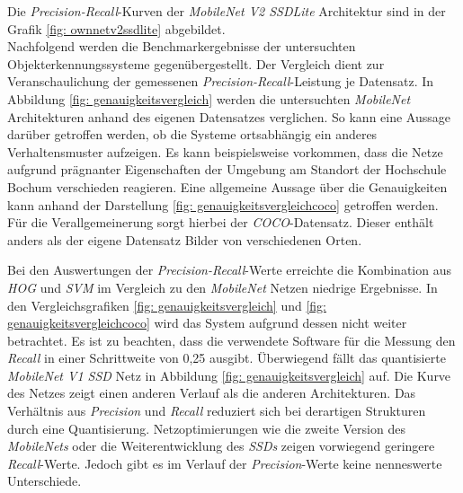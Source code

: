  

 
  
Die \textit{Precision-Recall}-Kurven der \textit{MobileNet V2 SSDLite} Architektur sind in der Grafik \ref{fig: ownnetv2ssdlite} abgebildet. \\

Nachfolgend werden die Benchmarkergebnisse der untersuchten Objekterkennungssysteme gegenübergestellt. Der Vergleich dient zur Veranschaulichung der gemessenen \textit{Precision-Recall}-Leistung je Datensatz. In Abbildung \ref{fig: genauigkeitsvergleich} werden die untersuchten \textit{MobileNet} Architekturen anhand des eigenen Datensatzes verglichen. So kann eine Aussage darüber getroffen werden, ob die Systeme ortsabhängig ein anderes Verhaltensmuster aufzeigen. Es kann beispielsweise vorkommen, dass die Netze aufgrund prägnanter Eigenschaften der Umgebung am Standort der Hochschule Bochum verschieden reagieren. Eine allgemeine Aussage über die Genauigkeiten kann anhand der Darstellung \ref{fig: genauigkeitsvergleichcoco} getroffen werden. Für die Verallgemeinerung sorgt hierbei der \textit{COCO}-Datensatz. Dieser enthält anders als der eigene Datensatz Bilder von verschiedenen Orten.     






Bei den Auswertungen der \textit{Precision-Recall}-Werte erreichte die Kombination aus \textit{HOG} und \textit{SVM} im Vergleich zu den \textit{MobileNet} Netzen niedrige Ergebnisse. In den Vergleichsgrafiken \ref{fig: genauigkeitsvergleich} und \ref{fig: genauigkeitsvergleichcoco} wird das System aufgrund dessen nicht weiter betrachtet. Es ist zu beachten, dass die verwendete Software für die Messung den \textit{Recall} in einer Schrittweite von 0,25 ausgibt. Überwiegend fällt das quantisierte \textit{MobileNet V1 SSD} Netz in Abbildung \ref{fig: genauigkeitsvergleich} auf. Die Kurve des Netzes zeigt einen anderen Verlauf als die anderen Architekturen. Das Verhältnis aus \textit{Precision} und \textit{Recall} reduziert sich bei derartigen Strukturen durch eine Quantisierung. Netzoptimierungen wie die zweite Version des \textit{MobileNets} oder die Weiterentwicklung des \textit{SSDs} zeigen vorwiegend geringere \textit{Recall}-Werte. Jedoch gibt es im Verlauf der \textit{Precision}-Werte keine nenneswerte Unterschiede. 







